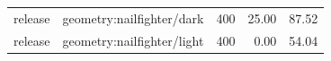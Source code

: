 \begin{longtable}{l>{\raggedright\arraybackslash}p{.42\linewidth}rrr}
release & %
geometry:nailfighter/dark & %
400 & %
25.00 & %
87.52 \\ %

release & %
geometry:nailfighter/light & %
400 & %
0.00 & %
54.04 \\ %


\end{longtable}
